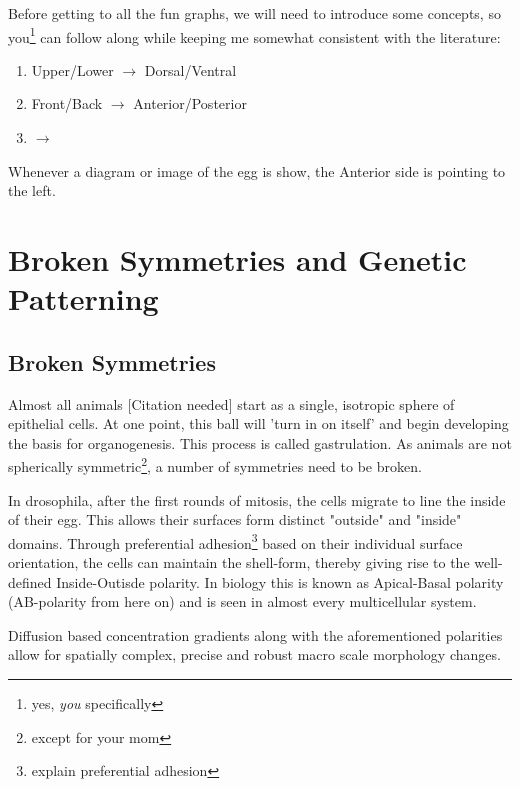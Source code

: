 Before getting to all the fun graphs, we will need to introduce some concepts, so you\footnote{yes, \textit{you} specifically} can follow along while keeping me somewhat consistent with the literature:

\begin{enumerate}
    \item Upper/Lower $\rightarrow$ Dorsal/Ventral
    \item Front/Back  $\rightarrow$ Anterior/Posterior
    \item   $\rightarrow$
\end{enumerate}

Whenever a diagram or image of the egg is show, the Anterior side is pointing to the left.

\section{Broken Symmetries and Genetic Patterning}
\label{sec:theory-polarity}
\subsection{Broken Symmetries}

Almost all animals [Citation needed] start as a single, isotropic sphere of epithelial cells. At one point, this ball will 'turn in on itself' and begin developing the basis for organogenesis. This process is called gastrulation. As animals are not spherically symmetric\footnote{except for your mom}, a number of symmetries need to be broken. 

In drosophila, after the first rounds of mitosis, the cells migrate to line the inside of their egg. This allows their surfaces form distinct "outside" and "inside" domains. Through preferential adhesion\footnote{explain  preferential adhesion} based on their individual surface orientation, the cells can maintain the shell-form, thereby giving rise to the well-defined Inside-Outisde polarity. In biology this is known as Apical-Basal polarity (AB-polarity from here on) and is seen in almost every multicellular system. 





Diffusion based concentration gradients along with the aforementioned polarities allow for spatially complex, precise and robust macro scale morphology changes.

